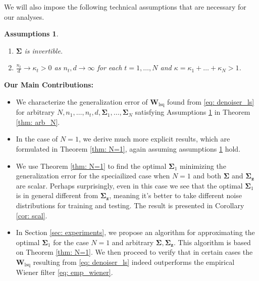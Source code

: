 \documentclass[final]{l4dc2026}
\newcommand{\bSigma}{\bm{\Sigma}}
\newcommand{\bW}{\mathbf{W}}
\newcommand{\bz}{\mathbf{z}}
\newtheorem{assumption}{Assumptions}
\begin{document}
\bigskip



We will also impose the following technical assumptions that are necessary for our analyses.
\begin{assumption}\label{ass: main}
    \begin{enumerate}
        \item $\bSigma$ is invertible.
        \item $\frac{n_t}{d} \to  \kappa_t > 0$ as $n_t, d \rightarrow \infty$ for each $t=1,\dots, N$ and $\kappa = \kappa_1 + \dots + \kappa_N > 1$. 
    \end{enumerate}
\end{assumption}
\textbf{Our Main Contributions:}
\begin{itemize}
    \item We characterize the generalization error of $\bW_{\text{lsq}}$ found from \eqref{eq: denoiser_ls} for arbitrary $N, n_1,\dots,n_t,d, \allowbreak \bSigma_1, \dots, \bSigma_N$ satisfying Assumptions \ref{ass: main} in Theorem \ref{thm: arb_N}.
    \item In the case of $N=1$, we derive much more explicit results, which are formulated  in Theorem \ref{thm: N=1}, again assuming assumptions \ref{ass: main} hold. 
    \item We use Theorem \ref{thm: N=1} to find the optimal $\bSigma_1$ minimizing the generalization error for the speciailized case when $N=1$ and both $\bSigma$ and $\bSigma_\bz$ are scalar. Perhaps surprisingly, even in this case we see that the optimal $\bSigma_1$ is in general different from $\bSigma_\bz$, meaning it's better to take different noise distributions for training and testing. The result is presented in Corollary \ref{cor: scal}. 
    \item In Section \ref{sec: experiments}, we propose an algorithm for approximating the optimal $\bSigma_1$ for the case $N=1$ and arbitrary $\bSigma, \bSigma_\bz$. This algorithm is based on Theorem \ref{thm: N=1}.  We then proceed to verify that in certain cases the $\bW_{\text{lsq}}$ resulting from \eqref{eq: denoiser_ls} indeed outperforms the empirical Wiener filter \eqref{eq: emp_wiener}.  
\end{itemize}
\end{document}
